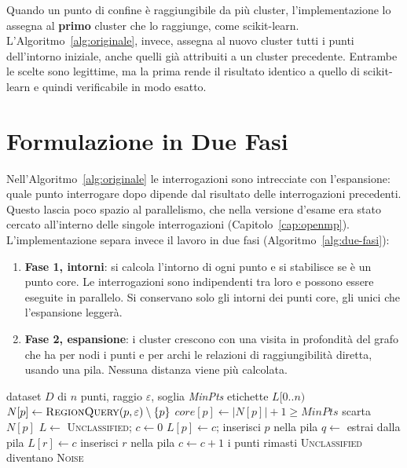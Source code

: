 Quando un punto di confine è raggiungibile da più cluster, l'implementazione lo assegna al \textbf{primo} cluster che lo raggiunge, come scikit-learn. L'Algoritmo~\ref{alg:originale}, invece, assegna al nuovo cluster tutti i punti dell'intorno iniziale, anche quelli già attribuiti a un cluster precedente. Entrambe le scelte sono legittime, ma la prima rende il risultato identico a quello di scikit-learn e quindi verificabile in modo esatto.

\section{Formulazione in Due Fasi}
\label{sec:due-fasi}

Nell'Algoritmo~\ref{alg:originale} le interrogazioni sono intrecciate con l'espansione: quale punto interrogare dopo dipende dal risultato delle interrogazioni precedenti. Questo lascia poco spazio al parallelismo, che nella versione d'esame era stato cercato all'interno delle singole interrogazioni (Capitolo~\ref{cap:openmp}). L'implementazione separa invece il lavoro in due fasi (Algoritmo~\ref{alg:due-fasi}):

\begin{enumerate}
    \item \textbf{Fase 1, intorni}: si calcola l'intorno di ogni punto e si stabilisce se è un punto core. Le interrogazioni sono indipendenti tra loro e possono essere eseguite in parallelo. Si conservano solo gli intorni dei punti core, gli unici che l'espansione leggerà.
    \item \textbf{Fase 2, espansione}: i cluster crescono con una visita in profondità del grafo che ha per nodi i punti e per archi le relazioni di raggiungibilità diretta, usando una pila. Nessuna distanza viene più calcolata.
\end{enumerate}

\begin{algorithm}[H]
\caption{DBSCAN in due fasi, come implementato in }
\label{alg:due-fasi}
\begin{algorithmic}[1]
\Require dataset $D$ di $n$ punti, raggio $\varepsilon$, soglia \textit{MinPts}
\Ensure etichette $L[0..n)$
 
    \State $N[p] \gets \textsc{RegionQuery}(p, \varepsilon) \setminus \{p\}$
    \State $\mathit{core}[p] \gets |N[p]| + 1 \ge \mathit{MinPts}$
     \State scarta $N[p]$ \EndIf
\EndFor
\State $L \gets$ \textsc{Unclassified}; $c \gets 0$ 
        \State $L[p] \gets c$; inserisci $p$ nella pila
            \State $q \gets$ estrai dalla pila 
                \State $L[r] \gets c$
                 \State inserisci $r$ nella pila \EndIf
            \EndFor
        \EndWhile
        \State $c \gets c + 1$
    \EndIf
\EndFor
\State i punti rimasti \textsc{Unclassified} diventano \textsc{Noise}
\end{algorithmic}
\end{algorithm}

